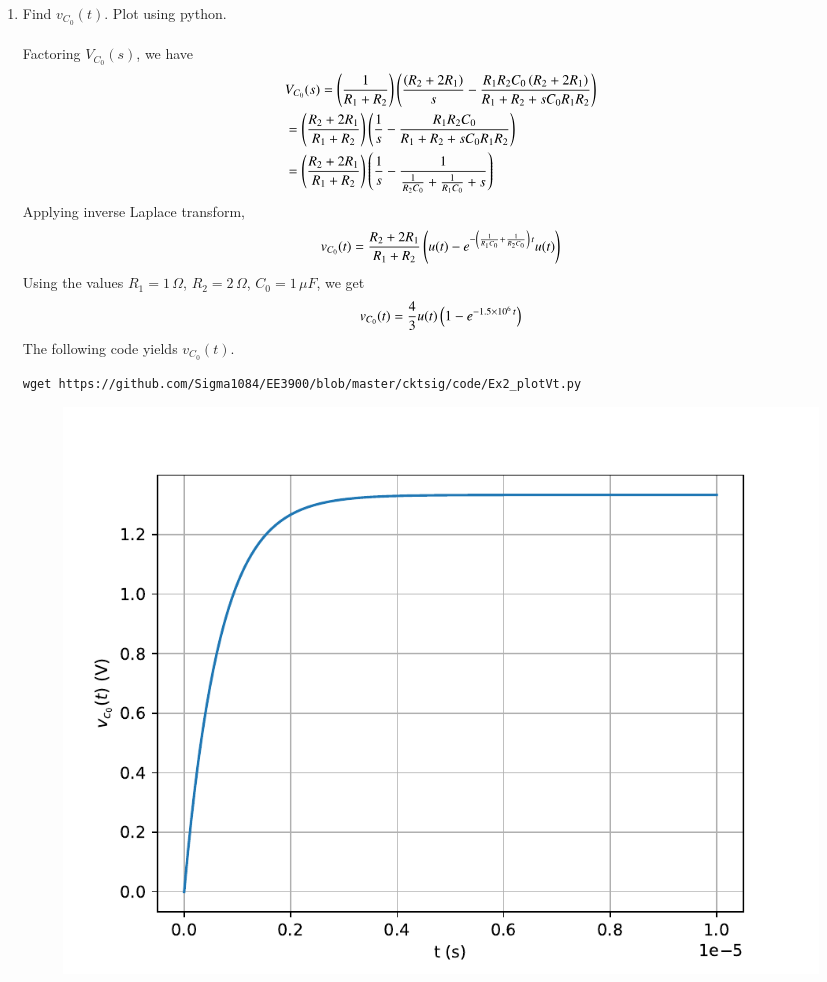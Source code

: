 \documentclass[journal,12pt,twocolumn]{IEEEtran}
\renewcommand\thesection{\arabic{section}}
\begin{document}
\begin{enumerate}[label=\arabic*.,ref=\thesection.\theenumi]
\item Find $v_{C_0}(t)$.  Plot using python.\\
	\solution\\
	Factoring $V_{C_0}(s)$, we have 
	\begin{align*}
		&V_{C_0}(s) = \left( \frac{1}{R_1+R_2} \right) \left( \frac{\left(R_2 + 2R_1\right)}{s} - \frac{R_1 R_2 C_0 \left(R_2 + 2R_1\right)}{R_1 + R_2 + sC_0 R_1 R_2} \right) \\
		&= \left(\frac{R_2 + 2R_1}{R_1 + R_2}\right) \left(\frac{1}{s} - \frac{R_1 R_2 C_0}{R_1 + R_2 + sC_0 R_1 R_2}\right) \\
		&= \left(\frac{R_2 + 2R_1}{R_1 + R_2}\right) \left(\frac{1}{s} - \frac{1}{\frac{1}{R_2 C_0} + \frac{1}{R_1 C_0} + s}\right) 
	\end{align*}
	Applying inverse Laplace transform,
	\begin{align*}
		v_{C_0}(t) = \frac{R_2 + 2R_1}{R_1 + R_2} \left(u(t) - e^{-\left(\frac{1}{R_1 C_0} + \frac{1}{R_2 C_0}\right) \, t} u(t)\right)
	\end{align*}
	Using the values $R_1 = 1 \, \Omega$, $R_2 = 2 \, \Omega$, $C_0 = 1 \, \mu F$, we get
	\begin{align*}
		v_{C_0}(t) = \frac{4}{3} u(t) \left(1 - e^{-1.5 \times 10^{6} \, t}\right) 
	\end{align*}
	The following code yields $v_{C_0}(t)$.
	\begin{lstlisting}
wget https://github.com/Sigma1084/EE3900/blob/master/cktsig/code/Ex2_plotVt.py
	\end{lstlisting}
	\begin{figure}[!ht]
		\centering
		\includegraphics[width=\columnwidth]{figs/Ex2_vt.pdf}
		\caption {}
		\label{fig:vt_calc}
	\end{figure}
	\pagebreak



\end{enumerate}
\end{document}
